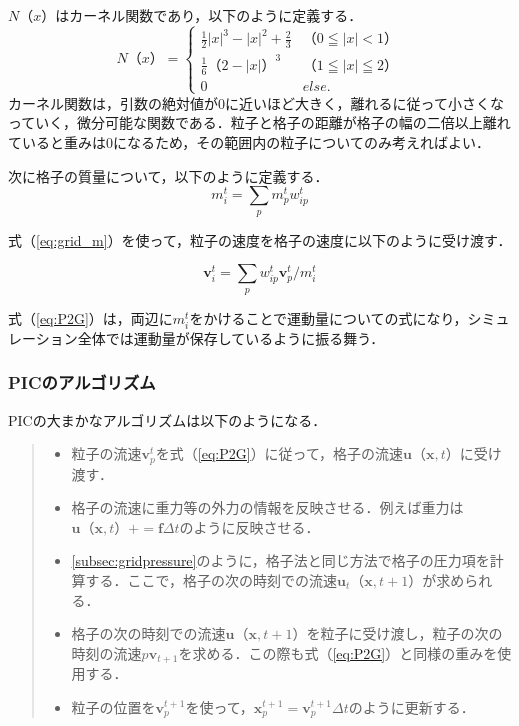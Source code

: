 \documentclass[a4j,12pt]{jreport}
\begin{document}
$N（x）$はカーネル関数であり，以下のように定義する．
\begin{equation}\label{eq:kernel}
N（x） = 
\begin{cases}
\frac{1}{2}|x|^3 - |x|^2 + \frac{2}{3} & （0\leqq|x|<1） \\
\frac{1}{6}（2-|x|）^3 & （1\leqq|x|\leqq2） \\
0 & else.
\end{cases}
\end{equation} 
カーネル関数は，引数の絶対値が0に近いほど大きく，離れるに従って小さくなっていく，微分可能な関数である．粒子と格子の距離が格子の幅の二倍以上離れていると重みは0になるため，その範囲内の粒子についてのみ考えればよい．

次に格子の質量について，以下のように定義する．
\begin{equation}\label{eq:grid_m}
m^t_i = \sum\limits_p m^t_pw^t_{ip}
\end{equation} 

式（\ref{eq:grid_m}）を使って，粒子の速度を格子の速度に以下のように受け渡す．

\begin{equation}\label{eq:P2G}
\bm{v}^t_i = \sum\limits_p w^t_{ip}\bm{v}^t_p / m^t_i
\end{equation} 

式（\ref{eq:P2G}）は，両辺に$m^t_i$をかけることで運動量についての式になり，シミュレーション全体では運動量が保存しているように振る舞う．

\subsubsection{PICのアルゴリズム} \label{subsec:PIC_algo}
PICの大まかなアルゴリズムは以下のようになる．
\begin{quote}
	\begin{itemize}
		\item 粒子の流速$\bm{v}^{t}_p$を式（\ref{eq:P2G}）に従って，格子の流速$\bm{u}（\bm{x},t）$に受け渡す．
		\item 格子の流速に重力等の外力の情報を反映させる．例えば重力は$\bm{u}（\bm{x},t） += \bm{f}\varDelta t$のように反映させる．
		\item \ref{subsec:gridpressure}のように，格子法と同じ方法で格子の圧力項を計算する．ここで，格子の次の時刻での流速$\bm{u}_t（\bm{x},t+1）$が求められる．
		\item 格子の次の時刻での流速$\bm{u}（\bm{x},t+1）$を粒子に受け渡し，粒子の次の時刻の流速$p\bm{v}_{t+1}$を求める．この際も式（\ref{eq:P2G}）と同様の重みを使用する．
		\item 粒子の位置を$\bm{v}^{t+1}_p$を使って，$\bm{x}^{t+1}_p = \bm{v}^{t+1}_p\varDelta t $のように更新する．
	\end{itemize}
\end{quote}
\end{document}

